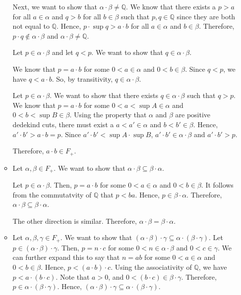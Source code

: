 \documentclass[12pt]{article}
\begin{document}
\begin{enumerate}[start=1,label={\bfseries Problem \arabic*:},leftmargin=1in]
\begin{itemize}
        Next, we want to show that $\alpha \cdot \beta \neq \mathbb{Q}$.
        We know that there exists a $p > a$ for all $a \in \alpha$ and $q > b$ for all $b \in \beta$ such that $p, q \in \mathbb{Q}$ since they are both not equal to $\mathbb{Q}$.
        Hence, $p \cdot \sup q > a \cdot b$ for all $a \in \alpha$ and $b \in \beta$. Therefore, $p \cdot q \not \in \alpha \cdot \beta$ and $\alpha \cdot \beta \neq \mathbb{Q}$.
        
        Let $p \in \alpha \cdot \beta$ and let $q < p$. We want to show that $q \in \alpha \cdot \beta$.

        We know that $p = a \cdot b$ for some $0 < a \in \alpha$ and $0 < b \in \beta$. Since $q < p$, we have $q < a \cdot b$. So, by transitivity, $q \in \alpha \cdot \beta$.
        
        Let $p \in \alpha \cdot \beta$. We want to show that there exists $q \in \alpha \cdot \beta$ such that $q > p$.
        We know that $p = a \cdot b$ for some $0 < a < \sup A \in \alpha$ and $0 < b < \sup B \in \beta$. Using the property that $\alpha$ and $\beta$ are positive dedekind cuts, 
        there must exist a $a < a' \in \alpha$ and $b < b' \in \beta$. Hence, $a' \cdot b' > a \cdot b = p$. Since $a' \cdot b' < \sup A \cdot \sup B$, $a' \cdot b' \in \alpha \cdot \beta$ and $a' \cdot b' > p$.

        Therefore, $a \cdot b \in F_{+}$. 
        \item Let $\alpha, \beta \in F_{+}$. We want to show that $\alpha \cdot \beta \subseteq \beta \cdot \alpha$.
        
        Let $p \in \alpha \cdot \beta$. Then, $p = a \cdot b$ for some $0 < a \in \alpha$ and $0 < b \in \beta$.
        It follows from the commutatvity of $\mathbb{Q}$ that $p < ba$. Hence, $p \in \beta \cdot \alpha$. Therefore, $\alpha \cdot \beta \subseteq \beta \cdot \alpha$. 

        The other direction is similar. Therefore, $\alpha \cdot \beta = \beta \cdot \alpha$.

        \item Let $\alpha, \beta, \gamma \in F_{+}$. We want to show that $(\alpha \cdot \beta) \cdot \gamma \subseteq \alpha \cdot (\beta \cdot \gamma)$.
        Let $p \in (\alpha \cdot \beta) \cdot \gamma$. Then, $p = n \cdot c$ for some $0 < n \in \alpha \cdot \beta$ and $0 < c \in \gamma$.
        We can further expand this to say that $n = ab$ for some $0 < a \in \alpha$ and $0 < b \in \beta$. Hence, $p < (a \cdot b) \cdot c$. Using the associativity of $\mathbb{Q}$, we have $p < a \cdot (b \cdot c)$. 
        Note that $a > 0$, and $0 < (b \cdot c) \in \beta \cdot \gamma$. Therefore, $p \in \alpha \cdot (\beta \cdot \gamma)$. Hence, $(\alpha \cdot \beta) \cdot \gamma \subseteq \alpha \cdot (\beta \cdot \gamma)$.
    

\end{itemize}
\end{enumerate}
\end{document}
